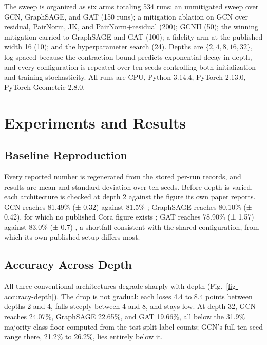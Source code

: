 \documentclass[
  conference]{IEEEtran}
\begin{document}
The sweep is organized as six arms totaling 534 runs: an unmitigated
sweep over GCN, GraphSAGE, and GAT (150 runs); a mitigation ablation on
GCN over residual, PairNorm, JK, and PairNorm+residual (200); GCNII
(50); the winning mitigation carried to GraphSAGE and GAT (100); a
fidelity arm at the published width 16 (10); and the hyperparameter
search (24). Depths are \(\{2,4,8,16,32\}\), log-spaced because the
contraction bound predicts exponential decay in depth, and every
configuration is repeated over ten seeds controlling both initialization
and training stochasticity. All runs are CPU, Python 3.14.4, PyTorch
2.13.0, PyTorch Geometric 2.8.0.

\section{Experiments and Results}\label{experiments-and-results}

\subsection{Baseline Reproduction}\label{baseline-reproduction}

Every reported number is regenerated from the stored per-run records,
and results are mean and standard deviation over ten seeds. Before depth
is varied, each architecture is checked at depth 2 against the figure
its own paper reports. GCN reaches 81.49\% (± 0.32) against 81.5\%
\citep{kipf2017semi}; GraphSAGE reaches 80.10\% (± 0.42), for which no
published Cora figure exists \citep{hamilton2017inductive}; GAT reaches
78.90\% (± 1.57) against 83.0\% (± 0.7) \citep{velickovic2018graph}, a
shortfall consistent with the shared configuration, from which its own
published setup differs most.

\subsection{Accuracy Across Depth}\label{accuracy-across-depth}

All three conventional architectures degrade sharply with depth
(Fig.~\ref{fig-accuracy-depth}). The drop is not gradual: each loses 4.4
to 8.4 points between depths 2 and 4, falls steeply between 4 and 8, and
stays low. At depth 32, GCN reaches 24.07\%, GraphSAGE 22.65\%, and GAT
19.66\%, all below the 31.9\% majority-class floor computed from the
test-split label counts; GCN's full ten-seed range there, 21.2\% to
26.2\%, lies entirely below it.
\end{document}
